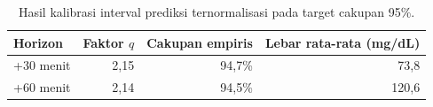 \begin{table}[!htbp]
    \centering
    \caption{Hasil kalibrasi interval prediksi ternormalisasi pada target cakupan 95\%.}
    \label{tab:tab6.6_hasil_kalibrasi_ketidakpastian}
    \begin{tabular}{lrrr}
        \hline
        \textbf{Horizon} & \textbf{Faktor $q$} & \textbf{Cakupan empiris} & \textbf{Lebar rata-rata (mg/dL)} \\
        \hline
        +30 menit & 2,15 & 94,7\% & 73,8 \\
        +60 menit & 2,14 & 94,5\% & 120,6 \\
        \hline
    \end{tabular}
\end{table}
